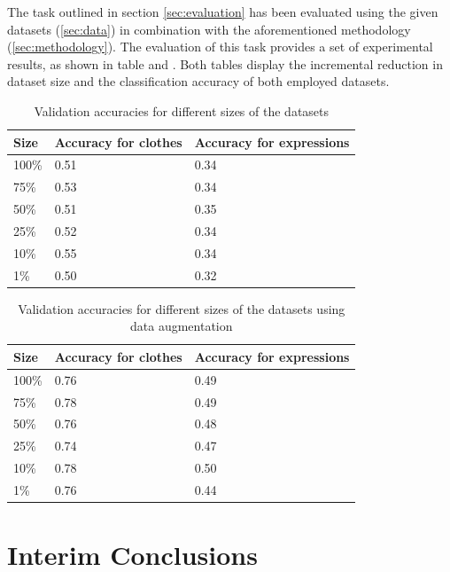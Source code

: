 \documentclass{article}
\begin{document}
The task outlined in section \ref{sec:evaluation} has been evaluated using the given datasets (\ref{sec:data}) in combination with the aforementioned methodology (\ref{sec:methodology}). The evaluation of this task provides a set of experimental results, as shown in table \label{tab:2} and \label{tab:3}. Both tables display the incremental reduction in dataset size and the classification accuracy of both employed datasets.

\begin{table}[!htb]
  \centering
  \begin{tabular}{| l | l | l |}
    \hline
    \textbf{Size} & \textbf{Accuracy for clothes} & \textbf{Accuracy for expressions}\\ \hline
    100\% & 0.51 & 0.34\\ \hline
    75\% & 0.53  & 0.34\\ \hline
    50\% & 0.51 & 0.35\\ \hline
	25\% & 0.52 & 0.34\\ \hline
	10\% & 0.55 & 0.34\\ \hline
	1\% & 0.50 & 0.32\\ \hline

  \end{tabular}
  \caption{Validation accuracies for different sizes of the datasets}
  \label{tab:2}
\end{table}

\begin{table}[!htb]
  \centering
  \begin{tabular}{| l | l | l |}
    \hline
    \textbf{Size} & \textbf{Accuracy for clothes} & \textbf{Accuracy for expressions}\\ \hline
    100\% & 0.76 & 0.49\\ \hline
    75\% & 0.78  & 0.49\\ \hline
    50\% & 0.76 & 0.48\\ \hline
	25\% & 0.74 & 0.47\\ \hline
	10\% & 0.78 & 0.50\\ \hline
	1\% & 0.76 & 0.44\\ \hline

  \end{tabular}
  \caption{Validation accuracies for different sizes of the datasets using data augmentation}
  \label{tab:3}
\end{table}


\section{Interim Conclusions}
\label{sec:conclusions}
\end{document}
